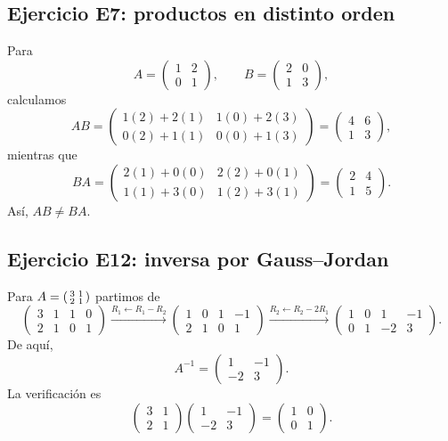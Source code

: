 \documentclass[12pt]{article}
\theoremstyle{remark}
\begin{document}
\subsection*{Ejercicio E7: productos en distinto orden}
Para
\[
A=\begin{pmatrix}1&2\\0&1\end{pmatrix},\qquad
B=\begin{pmatrix}2&0\\1&3\end{pmatrix},
\]
calculamos
\[
AB=\begin{pmatrix}1(2)+2(1)&1(0)+2(3)\\0(2)+1(1)&0(0)+1(3)\end{pmatrix}
=\boxed{\begin{pmatrix}4&6\\1&3\end{pmatrix}},
\]
mientras que
\[
BA=\begin{pmatrix}2(1)+0(0)&2(2)+0(1)\\1(1)+3(0)&1(2)+3(1)\end{pmatrix}
=\boxed{\begin{pmatrix}2&4\\1&5\end{pmatrix}}.
\]
Así, $AB\ne BA$.

\subsection*{Ejercicio E12: inversa por Gauss--Jordan}
Para $A=\begin{psmallmatrix}3&1\\2&1\end{psmallmatrix}$ partimos de
\[
\left(\begin{array}{cc|cc}3&1&1&0\\2&1&0&1\end{array}\right)
\xrightarrow{R_1\leftarrow R_1-R_2}
\left(\begin{array}{cc|cc}1&0&1&-1\\2&1&0&1\end{array}\right)
\xrightarrow{R_2\leftarrow R_2-2R_1}
\left(\begin{array}{cc|cc}1&0&1&-1\\0&1&-2&3\end{array}\right).
\]
De aquí,
\[
\boxed{A^{-1}=\begin{pmatrix}1&-1\\-2&3\end{pmatrix}}.
\]
La verificación es
\[
\begin{pmatrix}3&1\\2&1\end{pmatrix}
\begin{pmatrix}1&-1\\-2&3\end{pmatrix}
=\begin{pmatrix}1&0\\0&1\end{pmatrix}.
\]
\end{document}
